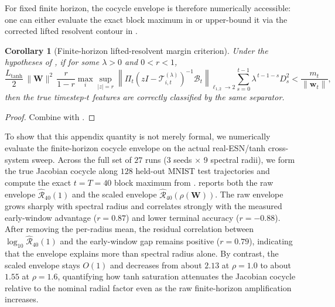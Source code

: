 \documentclass{article}
\newtheorem{corollary}[theorem]{Corollary}
\theoremstyle{remark}
\newcommand{\bW}{\mathbf{W}}
\begin{document}
For fixed finite horizon, the cocycle envelope is therefore numerically
accessible: one can either evaluate the exact block maximum in
 or upper-bound it via the corrected lifted
resolvent contour in .

\begin{corollary}[Finite-horizon lifted-resolvent margin criterion]
\label{cor:lifted_resolvent}
Under the hypotheses of , if for some $\lambda>0$
and $0<r<1$,
\begin{equation}
  \frac{L_{\tanh}}{2}\,\|\bW\|^2\,
  \frac{r}{1-r}
  \max_i \sup_{|z|=r}
  \left\|
    \Pi_t (zI-\mathcal{T}_{i,t}^{(\lambda)})^{-1}\mathcal{B}_t
  \right\|_{\ell_{1,2}\to 2}
  \sum_{s=0}^{t-1}\lambda^{\,t-1-s}D_s^2
  <
  \frac{m_t}{\|\mathbf{w}_t\|},
  \label{eq:lifted_resolvent_margin}
\end{equation}
then the true timestep-$t$ features are correctly classified by the same
separator.
\end{corollary}

\begin{proof}
Combine  with
.
\end{proof}

To show that this appendix quantity is not merely formal, we numerically
evaluate the finite-horizon cocycle envelope on the actual real-ESN/tanh
cross-system sweep. Across the full set of $27$ runs (3 seeds $\times$ 9
spectral radii), we form the true Jacobian cocycle along $128$ held-out MNIST
test trajectories and compute the exact
$t=T=40$ block maximum from . 
reports both the raw envelope $\widehat{\mathcal{R}}_{40}(1)$ and the scaled
envelope $\widehat{\mathcal{R}}_{40}(\rho(\bW))$. The raw envelope grows sharply
with spectral radius and correlates strongly with the measured early-window
advantage ($r=0.87$) and lower terminal accuracy ($r=-0.88$). After removing
the per-radius mean, the residual correlation between
$\log_{10}\widehat{\mathcal{R}}_{40}(1)$ and the early-window gap remains
positive ($r=0.79$), indicating that the envelope explains more than spectral
radius alone. By contrast, the scaled envelope stays $O(1)$ and decreases from
about $2.13$ at $\rho=1.0$ to about $1.55$ at $\rho=1.6$, quantifying how tanh
saturation attenuates the Jacobian cocycle relative to the nominal radial
factor even as the raw finite-horizon amplification increases.
\end{document}
